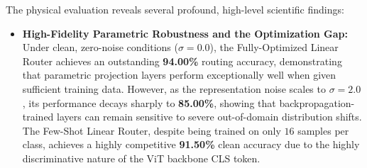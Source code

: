 The physical evaluation reveals several profound, high-level scientific findings:
\begin{itemize}
    \item \textbf{High-Fidelity Parametric Robustness and the Optimization Gap:} Under clean, zero-noise conditions ($\sigma=0.0$), the Fully-Optimized Linear Router achieves an outstanding \textbf{94.00\%} routing accuracy, demonstrating that parametric projection layers perform exceptionally well when given sufficient training data. However, as the representation noise scales to $\sigma=2.0$, its performance decays sharply to \textbf{85.00\%}, showing that backpropagation-trained layers can remain sensitive to severe out-of-domain distribution shifts. The Few-Shot Linear Router, despite being trained on only $16$ samples per class, achieves a highly competitive \textbf{91.50\%} clean accuracy due to the highly discriminative nature of the ViT backbone CLS token.


\end{itemize}

